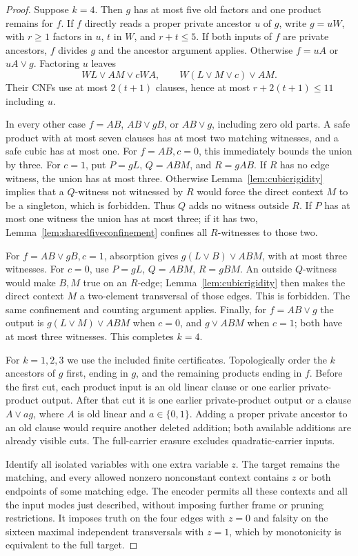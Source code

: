 \begin{proof}
Suppose $k=4$. Then $g$ has at most five old factors and one product remains for $f$. If $f$ directly reads a proper private ancestor $u$ of $g$, write $g=uW$, with $r\geq1$ factors in $u$, $t$ in $W$, and $r+t\leq5$. If both inputs of $f$ are private ancestors, $f$ divides $g$ and the ancestor argument applies. Otherwise $f=uA$ or $uA\vee g$. Factoring $u$ leaves
\[
 WL\vee AM\vee cWA,
 \qquad W(L\vee M\vee c)\vee AM.
\]
Their CNFs use at most $2(t+1)$ clauses, hence at most $r+2(t+1)\leq11$ including $u$.

In every other case $f=AB$, $AB\vee gB$, or $AB\vee g$, including zero old parts. A safe product with at most seven clauses has at most two matching witnesses, and a safe cubic has at most one. For $f=AB,c=0$, this immediately bounds the union by three. For $c=1$, put $P=gL$, $Q=ABM$, and $R=gAB$. If $R$ has no edge witness, the union has at most three. Otherwise Lemma~\ref{lem:cubicrigidity} implies that a $Q$-witness not witnessed by $R$ would force the direct context $M$ to be a singleton, which is forbidden. Thus $Q$ adds no witness outside $R$. If $P$ has at most one witness the union has at most three; if it has two, Lemma~\ref{lem:sharedfiveconfinement} confines all $R$-witnesses to those two.

For $f=AB\vee gB,c=1$, absorption gives $g(L\vee B)\vee ABM$, with at most three witnesses. For $c=0$, use $P=gL$, $Q=ABM$, $R=gBM$. An outside $Q$-witness would make $B,M$ true on an $R$-edge; Lemma~\ref{lem:cubicrigidity} then makes the direct context $M$ a two-element transversal of those edges. This is forbidden. The same confinement and counting argument applies. Finally, for $f=AB\vee g$ the output is $g(L\vee M)\vee ABM$ when $c=0$, and $g\vee ABM$ when $c=1$; both have at most three witnesses. This completes $k=4$.

For $k=1,2,3$ we use the included finite certificates. Topologically order the $k$ ancestors of $g$ first, ending in $g$, and the remaining products ending in $f$. Before the first cut, each product input is an old linear clause or one earlier private-product output. After that cut it is one earlier private-product output or a clause $A\vee ag$, where $A$ is old linear and $a\in\{0,1\}$. Adding a proper private ancestor to an old clause would require another deleted addition; both available additions are already visible cuts. The full-carrier erasure excludes quadratic-carrier inputs.

Identify all isolated variables with one extra variable $z$. The target remains the matching, and every allowed nonzero nonconstant context contains $z$ or both endpoints of some matching edge. The encoder permits all these contexts and all the input modes just described, without imposing further frame or pruning restrictions. It imposes truth on the four edges with $z=0$ and falsity on the sixteen maximal independent transversals with $z=1$, which by monotonicity is equivalent to the full target.


\end{proof}
